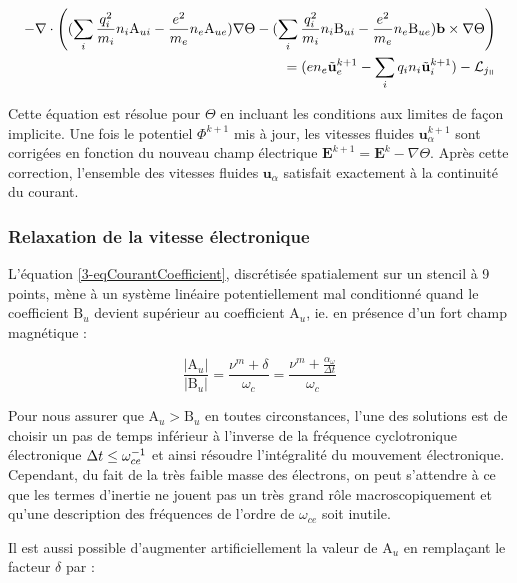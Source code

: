 \begin{refsection}
\begin{equation}
\begin{split}
\label{3-eqCourantCoefficient}
-\nabla\cdot\left((\sum_i\frac{q_i^2}{m_i}n_i\text{A}_{ui}-\frac{e^2}{m_e}n_e\text{A}_{ue})\nabla
\Theta-(\sum_i\frac{q_i^2}{m_i}n_i\text{B}_{ui}-\frac{e^2}{m_e}n_e\text{B}_{ue})\mathbf
b\times\nabla
\Theta\right)\\=(en_e\tilde{\mathbf
u}_e^{k+1}-\sum_iq_in_i\tilde{\mathbf u}_i^{k+1})-\mathcal L_{j_\para}
\end{split}
\end{equation}

Cette équation est résolue pour $\Theta$ en incluant les conditions aux limites
de façon implicite. Une fois le potentiel $\Phi^{k+1}$ mis à jour, les vitesses
fluides $\mathbf u^{k+1}_\alpha$ sont corrigées en fonction du nouveau champ
électrique $\mathbf{E}^{k+1}=\mathbf{E}^{k}-\nabla\Theta$.
Après cette correction, l'ensemble des vitesses fluides $\mathbf u_\alpha$
satisfait exactement à la continuité du courant.

\subsubsection{Relaxation de la vitesse électronique}

L'équation \eqref{3-eqCourantCoefficient}, discrétisée spatialement sur un
stencil à 9 points, mène à un système linéaire potentiellement mal conditionné
quand le coefficient $\text{B}_u$ devient supérieur au coefficient $\text{A}_u$,
ie. en présence d'un fort champ magnétique :

\begin{equation}
\frac{|\text{A}_u|}{|\text{B}_u|}=\frac{\nu^m+\delta}{\omega_c}=\frac{\nu^m+\frac{\alpha_\omega}{\Delta
t}}{\omega_c}
\end{equation}

Pour nous assurer que $\text{A}_u>\text{B}_u$ en toutes circonstances, l'une
des solutions est de choisir un pas de temps inférieur à l'inverse de la
fréquence cyclotronique électronique $\Delta t\leq\omega_{ce}^{{-1}}$ et
ainsi résoudre l'intégralité du mouvement électronique. Cependant, du fait de
la très faible masse des électrons, on peut s'attendre à ce que les termes
d'inertie ne jouent pas un très grand rôle macroscopiquement et qu'une
description des fréquences de l'ordre de $\omega_{ce}$ soit inutile.

Il est aussi possible d'augmenter artificiellement la valeur de $\text{A}_u$ en
remplaçant le facteur $\delta$ par :


\end{refsection}
